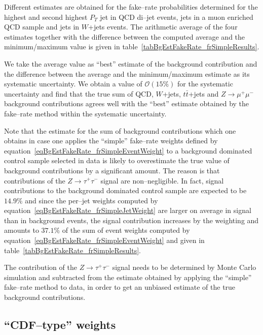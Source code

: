 Different estimates are obtained for the fake--rate probabilities 
determined for the highest and second highest $P_{T}$ jet in QCD di--jet events,
jets in a muon enriched QCD sample and jets in $W$+jets events.
The arithmetic average of the four estimates together with the difference between
the computed average and the minimum/maximum value is given in table~\ref{tabBgEstFakeRate_frSimpleResults}.

We take the average value as ``best'' estimate of the background contribution 
and the difference between the average and the minimum/maximum estimate as its systematic uncertainty.
We obtain a value of $\mathcal{O} \left( 15 \% \right)$ for the systematic uncertainty
and find that the true sum of QCD, $W$+jets, $t\bar{t}$+jets and $Z \rightarrow \mu^{+} \mu^{-}$ background contributions
agrees well with the ``best'' estimate obtained by the fake--rate method
within the systematic uncertainty.

Note that the estimate for the sum of background contributions which one obtains
in case one applies the ``simple'' fake--rate weights defined by equation~\ref{eqBgEstFakeRate_frSimpleEventWeight}
to a background dominated control sample selected in data is likely to overestimate the true value
of background contributions by a significant amount.
The reason is that contributions of the $Z \rightarrow \tau^{+} \tau^{-}$ signal are non--negligible.
In fact, signal contributions to the background dominated control sample are expected to be $14.9 \%$
and since the per--jet weights computed by equation~\ref{eqBgEstFakeRate_frSimpleJetWeight}
are larger on average in signal than in background events,
the signal contribution increases by the weighting and amounts to $37.1 \%$
of the sum of event weights computed by equation~\ref{eqBgEstFakeRate_frSimpleEventWeight}
and given in table~\ref{tabBgEstFakeRate_frSimpleResults}.

The contribution of the $Z \rightarrow \tau^{+} \tau^{-}$ signal
needs to be determined by Monte Carlo simulation
and subtracted from the estimate obtained by applying the ``simple'' fake--rate method to data,
in order to get an unbiased estimate of the true background contributions.


\subsection{``CDF--type'' weights}
\label{secBgEstFakeRate_frCDFtypeWeights}

